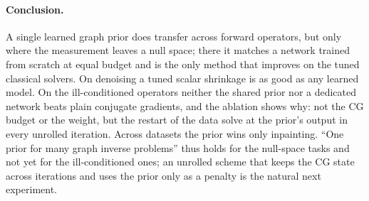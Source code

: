 \documentclass{article}
\begin{document}
\paragraph{Conclusion.} A single learned graph prior does transfer across forward operators, but only where
the measurement leaves a null space; there it matches a network trained from scratch at equal budget and is the
only method that improves on the tuned classical solvers. On denoising a tuned scalar shrinkage is as good as
any learned model. On the ill-conditioned operators neither the shared prior nor a dedicated network beats
plain conjugate gradients, and the ablation shows why: not the CG budget or the weight, but the restart of the
data solve at the prior's output in every unrolled iteration. Across datasets the prior wins only inpainting.
``One prior for many graph inverse problems'' thus holds for the null-space tasks and not yet for the
ill-conditioned ones; an unrolled scheme that keeps the CG state across iterations and uses the prior only as a
penalty is the natural next experiment.
\end{document}
